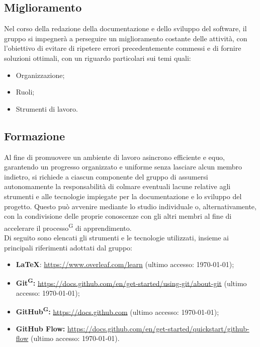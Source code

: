 \documentclass[8pt]{article}
\newcommand{\glossterm}[1]{#1\textsuperscript{G}} %
\begin{document}
\subsection{Miglioramento} \label{sec:miglioramento}
Nel corso della redazione della documentazione e dello sviluppo del software, il gruppo si impegnerà a perseguire un miglioramento costante delle attività, con l'obiettivo di evitare di ripetere errori precedentemente commessi e di fornire soluzioni ottimali, con un riguardo particolari sui temi quali:
\begin{itemize}
  \item Organizzazione;
  \item Ruoli;
  \item Strumenti di lavoro.
\end{itemize}
\subsection{Formazione} \label{sec:formazione}
Al fine di promuovere un ambiente di lavoro asincrono efficiente e equo, garantendo un progresso organizzato e uniforme senza lasciare alcun membro indietro, si richiede a ciascun componente del gruppo di assumersi autonomamente la responsabilità di colmare eventuali lacune relative agli strumenti e alle tecnologie impiegate per la documentazione e lo sviluppo del progetto. Questo può avvenire mediante lo studio individuale o, alternativamente, con la condivisione delle proprie conoscenze con gli altri membri al fine di accelerare il \glossterm{processo} di apprendimento.
\\Di seguito sono elencati gli strumenti e le tecnologie utilizzati, insieme ai principali riferimenti adottati dal gruppo:
\begin{itemize}
    \item \textbf{LaTeX}: \href{https://www.overleaf.com/learn}{https://www.overleaf.com/learn}
        (ultimo accesso: \today);
    \item \textbf{\glossterm{Git}:}
        \href{https://docs.github.com/en/get-started/using-git/about-git.}{https://docs.github.com/en/get-started/using-git/about-git}
        (ultimo accesso: \today);
    \item \textbf{\glossterm{GitHub}:} \href{https://docs.github.com}{https://docs.github.com} (ultimo accesso: \today);
    \item \textbf{GitHub Flow:}
        \href{https://docs.github.com/en/get-started/quickstart/github-flow}{https://docs.github.com/en/get-started/quickstart/github-flow}
        (ultimo accesso: \today).
\end{itemize}
\clearpage
\end{document}
